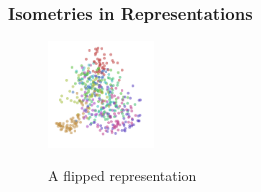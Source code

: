 \documentclass[a4paper,11pt,titlepage]{article}
\begin{document}
		\subsubsection{Isometries in Representations}
		
		\begin{figure}[H]
    			\qquad
    			{{\includegraphics[width=0.25\textwidth]
    				{img/colah_flip.png} 
    			}}%
    			\caption{A flipped representation}%
		\end{figure}
		
\end{document}
